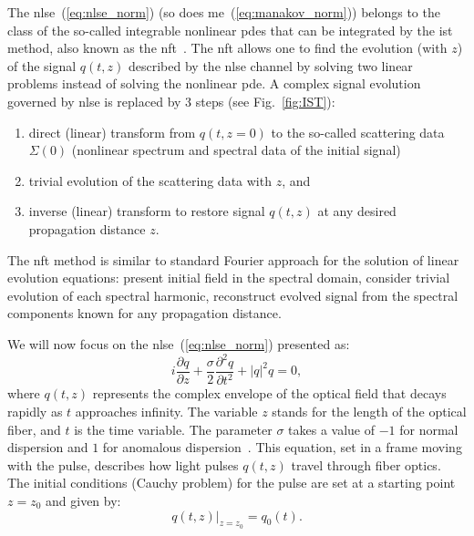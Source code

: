 The \acrlong{nlse}~(\ref{eq:nlse_norm}) (so does \acrlong{me}~(\ref{eq:manakov_norm})) belongs to the class of the so-called integrable nonlinear \acrfull{pde}s that can be integrated by the \Gls{ist} method, also known as the \acrfull{nft}~\cite{zakharov1972exact, Ablowitz1981}.
The \gls{nft} allows one to find the evolution (with $z$) of the signal $q(t,z)$ described by the \acrshort{nlse} channel by solving two linear problems instead of solving the nonlinear \acrfull{pde}. A complex signal evolution governed by \acrshort{nlse} is replaced by 3 steps (see Fig.~\ref{fig:IST}):
\begin{enumerate}
    \item direct (linear) transform from $q(t,z=0)$ to the so-called scattering data $\Sigma(0)$ (nonlinear spectrum and spectral data of the initial signal)
    \item trivial evolution of the scattering data with $z$, and
    \item inverse (linear) transform to restore signal $q(t,z)$ at any desired propagation distance $z$.
\end{enumerate}
The \acrshort{nft} method is similar to standard Fourier approach for the solution of linear evolution equations: present initial field in the spectral domain, consider trivial evolution of each spectral harmonic, reconstruct evolved signal from the spectral components known for any propagation distance.


We will now focus on the \gls{nlse}~(\ref{eq:nlse_norm}) presented as:
\begin{equation}
    i \frac{\partial q}{\partial z} + \frac{\sigma}{2} \frac{\partial^2 q}{\partial t^2} + |q|^2 q = 0,
    \label{eq:nlse_norm_again}
\end{equation}
where \( q(t, z) \) represents the complex envelope of the optical field that decays rapidly as \( t \) approaches infinity. The variable \( z \) stands for the length of the optical fiber, and \( t \) is the time variable. The parameter \( \sigma \) takes a value of \( -1 \) for normal dispersion and \( 1 \) for anomalous dispersion~\cite{Agrawal2010}. This equation, set in a frame moving with the pulse, describes how light pulses \( q(t, z) \) travel through fiber optics. The initial conditions (Cauchy problem) for the pulse are set at a starting point \( z=z_0 \) and given by:
\begin{equation}
    q(t, z)|_{z=z_0} = q_0(t).
\end{equation}

